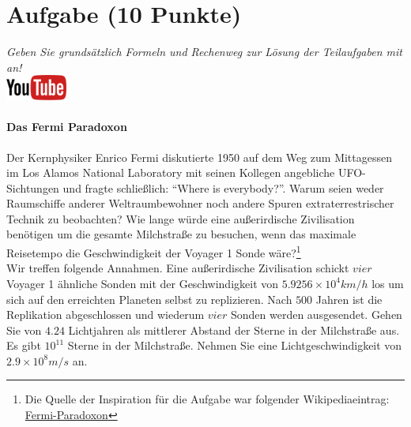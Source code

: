 \documentclass[a4paper, 9pt]{scrartcl}\usepackage[]{graphicx}\usepackage[]{xcolor}
\begin{document}
 
\clearpage

\section{Aufgabe \hfill (10 Punkte)}

\textit{Geben Sie grunds{\"a}tzlich Formeln und Rechenweg zur L{\"o}sung der
  Teilaufgaben mit an!} \\[1Ex]

\hfill\href{https://youtu.be/iCQogS6KhPM}{\includegraphics[width =
  2cm]{img/youtube}} %
\hspace{2Ex}

\paragraph{Das Fermi Paradoxon}



Der Kernphysiker Enrico Fermi diskutierte 1950 auf dem Weg zum Mittagessen
im Los Alamos National Laboratory mit seinen Kollegen angebliche
UFO-Sichtungen und fragte schlie{\ss}lich: "`Where is everybody?"'. Warum seien
weder Raumschiffe anderer Weltraumbewohner noch andere Spuren
extraterrestrischer Technik zu beobachten? Wie lange w{\"u}rde eine au{\ss}erirdische
Zivilisation ben{\"o}tigen um die gesamte Milchstra{\ss}e zu
besuchen, wenn das maximale Reisetempo die Geschwindigkeit der Voyager 1 Sonde w{\"a}re?\footnote{Die Quelle der Inspiration
  für die Aufgabe war folgender Wikipediaeintrag:
  \href{https://de.wikipedia.org/wiki/Fermi-Paradoxon}{Fermi-Paradoxon}}\\[-1ex]

Wir treffen folgende Annahmen. Eine au{\ss}erirdische Zivilisation schickt $vier$
Voyager 1 {\"a}hnliche Sonden mit der Geschwindigkeit von $\ensuremath{5.9256\times 10^{4}}km/h$
los um sich auf den erreichten Planeten selbst zu replizieren. Nach
$500$ Jahren ist die Replikation abgeschlossen und wiederum
$vier$ Sonden werden ausgesendet. Gehen Sie von
$4.24$ Lichtjahren als mittlerer Abstand der Sterne in der
Milchstra{\ss}e aus. Es gibt $\ensuremath{10^{11}}$ Sterne in der Milchstra{\ss}e. Nehmen
Sie eine Lichtgeschwindigkeit von $\ensuremath{2.9\times 10^{8}}m/s$ an.
\end{document}
